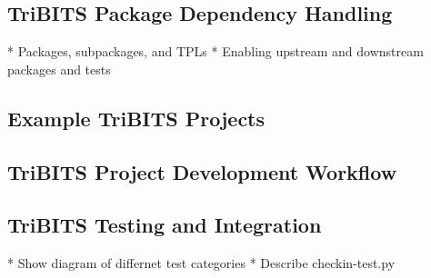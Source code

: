 \documentclass[10pt]{article}
\begin{document}
%
\subsection{TriBITS Package Dependency Handling}
%

* Packages, subpackages, and TPLs
* Enabling upstream and downstream packages and tests

%
\subsection{Example TriBITS Projects}
%



%
\subsection{TriBITS Project Development Workflow}
%


%
\subsection{TriBITS Testing and Integration}
%

* Show diagram of differnet test categories
* Describe checkin-test.py








\end{document}
